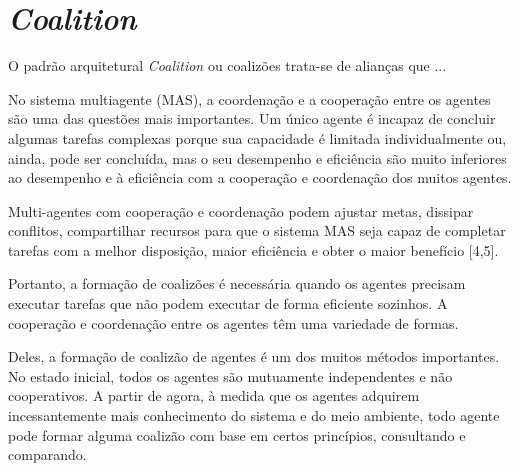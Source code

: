 \section{\textit{Coalition}}




O padrão arquitetural \textit{Coalition} ou coalizões trata-se de alianças que ...




No sistema multiagente (MAS), a coordenação e a cooperação entre os agentes são uma das questões mais importantes. Um único agente é incapaz de concluir algumas tarefas complexas porque sua capacidade é limitada individualmente ou, ainda, pode ser concluída, mas o seu desempenho e eficiência são muito inferiores ao desempenho e à eficiência com a cooperação e coordenação dos muitos agentes.

Multi-agentes com cooperação e coordenação podem ajustar metas, dissipar conflitos, compartilhar recursos para que o sistema MAS seja capaz de completar tarefas com a melhor disposição, maior eficiência e obter o maior benefício [4,5].

Portanto, a formação de coalizões é necessária quando os agentes precisam executar tarefas que não podem executar de forma eficiente sozinhos. A cooperação e coordenação entre os agentes têm uma variedade de formas.

Deles, a formação de coalizão de agentes é um dos muitos métodos importantes. No estado inicial, todos os agentes são mutuamente independentes e não cooperativos. A partir de agora, à medida que os agentes adquirem incessantemente mais conhecimento do sistema e do meio ambiente, todo agente pode formar alguma coalizão com base em certos princípios, consultando e comparando.


